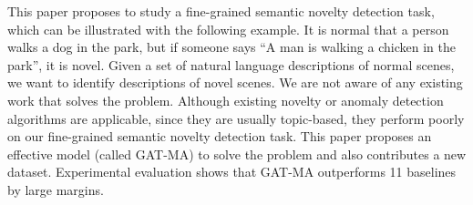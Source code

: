 This paper proposes to study a fine-grained semantic novelty detection task, which can be illustrated with the following example. It is normal that a person walks a dog in the park, but if someone says ``A man is walking a chicken in the park'', it is novel. Given a set of natural language descriptions of normal scenes, we want to identify descriptions of novel scenes. We are not aware of any existing work that solves the problem. Although existing novelty or anomaly detection algorithms are applicable, since they are usually topic-based, they perform poorly on our fine-grained semantic novelty detection task. This paper proposes an effective model (called GAT-MA) to solve the problem and also contributes a new dataset. Experimental evaluation shows that GAT-MA outperforms 11 baselines by large margins.
